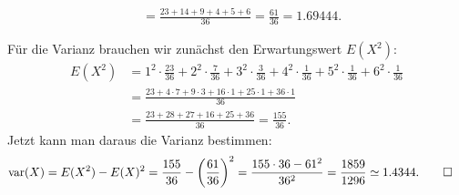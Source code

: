 \begin{loesung}
\begin{teilaufgaben}
\begin{align*}
&=\frac{23 + 14 + 9 + 4+5+6}{36}
=\frac{61}{36}=1.69444.
\end{align*}
\item
Für die Varianz brauchen wir zunächst den Erwartungswert $E(X^2)$:
\begin{align*}
E(X^2)&=
1^2\cdot\frac{23}{36}+
2^2\cdot\frac{7}{36}+
3^2\cdot\frac{3}{36}+
4^2\cdot\frac{1}{36}+
5^2\cdot\frac{1}{36}+
6^2\cdot\frac{1}{36}
\\
&=\frac{23 + 4\cdot 7 + 9\cdot 3+16\cdot 1+25\cdot 1+36\cdot 1}{36}\\
&=\frac{23 + 28 + 27 + 16+25+36}{36}
=\frac{155}{36}.
\end{align*}
Jetzt kann man daraus die Varianz bestimmen:
\begin{align*}
\operatorname{var}(X)
&=
E(X^2)-E(X)^2
=
\frac{155}{36}-\biggl(\frac{61}{36}\biggr)^2
=
\frac{155\cdot 36-61^2}{36^2}=\frac{1859}{1296}\simeq 1.4344.
\qedhere
\end{align*}
\end{teilaufgaben}
\end{loesung}

